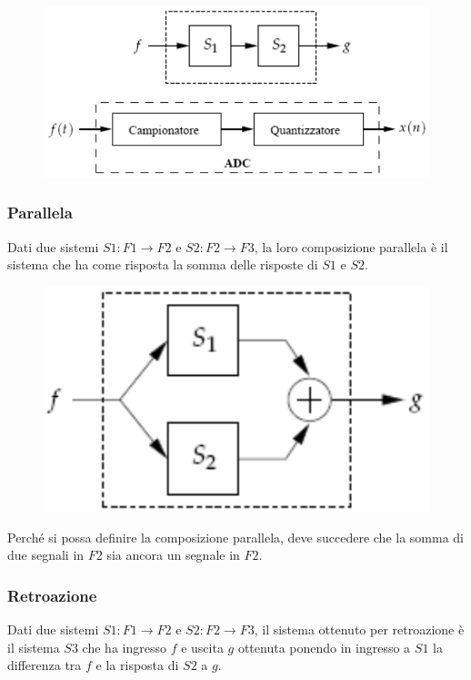 \begin{figure}[h]
	\centering
	\includegraphics[scale=0.4]{Lezioni/Immagini/cascata}
\end{figure}

\subsubsection{Parallela}
Dati due sistemi $S1 : F1 \rightarrow F2$ e $S2 : F2 \rightarrow F3$, la loro composizione parallela è il sistema che ha come risposta la somma delle risposte di $S1$ e $S2$.

\begin{figure}[h]
	\centering
	\includegraphics[scale=0.4]{Lezioni/Immagini/parallela}
\end{figure}

Perché si possa definire la composizione parallela, deve succedere che la somma di due segnali in $F2$ sia ancora un segnale in $F2$.

\subsubsection{Retroazione}
Dati due sistemi $S1 : F1 \rightarrow F2$ e $S2 : F2 \rightarrow F3$, il sistema ottenuto per retroazione è il sistema $S3$ che ha ingresso $f$ e uscita $g$ ottenuta ponendo in ingresso a $S1$ la differenza tra $f$ e la risposta di $S2$ a $g$.

